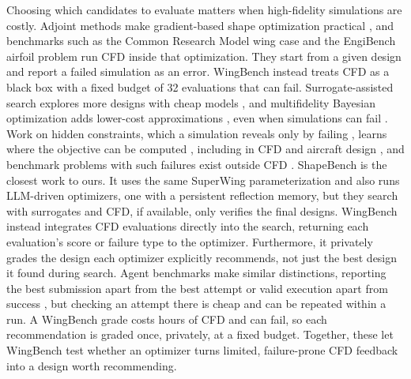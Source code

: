 \documentclass{article} %
\begin{document}
Choosing which candidates to evaluate matters when high-fidelity simulations
are costly. Adjoint methods make gradient-based shape
optimization practical \citep{martins2022aerodynamic}, and benchmarks such as
the Common Research Model wing case \citep{lyu2015crm} and the EngiBench
airfoil problem \citep{felten2025engibench} run CFD inside that optimization.
They start from a given design and report a failed simulation as an error. WingBench
instead treats CFD as a black box with a fixed budget of 32 evaluations that
can fail. Surrogate-assisted search explores more designs with cheap models
\citep{forrester2009recent,jin2011surrogate}, and multifidelity Bayesian
optimization adds lower-cost approximations
\citep{kandasamy2017multifidelity,takeno2020multifidelity}, even when
simulations can fail \citep{he2021variable}. Work on hidden constraints, which a
simulation reveals only by failing \citep{ledigabel2024taxonomy}, learns where
the objective can be computed
\citep{lee2011hidden,gelbart2014unknown,sacher2018classification,bachoc2020failures,chakrabarty2021failure},
including in CFD and aircraft design \citep{tran2019pbo,he2020dual,tfaily2024hidden}, and
benchmark problems with such failures exist outside CFD
\citep{stenger2022benchmark,bussemaker2024hidden}.
ShapeBench \citep{fazliani2026shapebench} is the closest work to ours. It uses
the same SuperWing parameterization and also runs LLM-driven optimizers, one
with a persistent reflection memory, but they search with surrogates and CFD,
if available, only verifies the final designs. WingBench instead integrates CFD evaluations
directly into the search, returning each evaluation's score or failure type to
the optimizer. Furthermore, it privately grades the design each optimizer
explicitly recommends, not just the best design it found during search. Agent
benchmarks make similar distinctions, reporting the best submission apart from
the best attempt \citep{nathani2025mlgym,chan2025mlebench,huang2024mlagentbench} or valid execution apart from success
\citep{chen2025scienceagentbench,somasekharan2026cfdllmbench}, but checking an
attempt there is cheap and can be repeated within a run. A WingBench grade
costs hours of CFD and can fail, so each recommendation is graded once,
privately, at a fixed budget. Together, these
let WingBench test whether an optimizer turns limited, failure-prone CFD
feedback into a design worth recommending.
\end{document}
